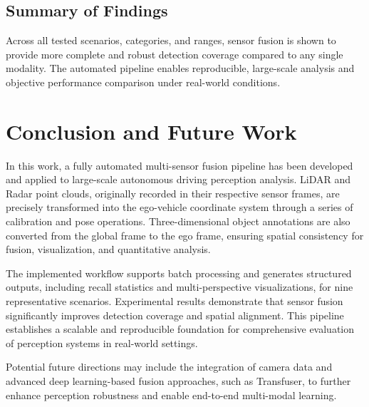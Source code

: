 \documentclass[10pt, a4paper, oneside]{article}
\begin{document}
\subsection{Summary of Findings}

Across all tested scenarios, categories, and ranges, sensor fusion is shown to provide more complete and robust detection coverage compared to any single modality. The automated pipeline enables reproducible, large-scale analysis and objective performance comparison under real-world conditions.

\begin{small}
\end{small}


\section{Conclusion and Future Work}

In this work, a fully automated multi-sensor fusion pipeline has been developed and applied to large-scale autonomous driving perception analysis. LiDAR and Radar point clouds, originally recorded in their respective sensor frames, are precisely transformed into the ego-vehicle coordinate system through a series of calibration and pose operations. Three-dimensional object annotations are also converted from the global frame to the ego frame, ensuring spatial consistency for fusion, visualization, and quantitative analysis.

The implemented workflow supports batch processing and generates structured outputs, including recall statistics and multi-perspective visualizations, for nine representative scenarios. Experimental results demonstrate that sensor fusion significantly improves detection coverage and spatial alignment. This pipeline establishes a scalable and reproducible foundation for comprehensive evaluation of perception systems in real-world settings.

Potential future directions may include the integration of camera data and advanced deep learning-based fusion approaches, such as Transfuser, to further enhance perception robustness and enable end-to-end multi-modal learning.

\begin{small}
\end{small}
\end{document}
